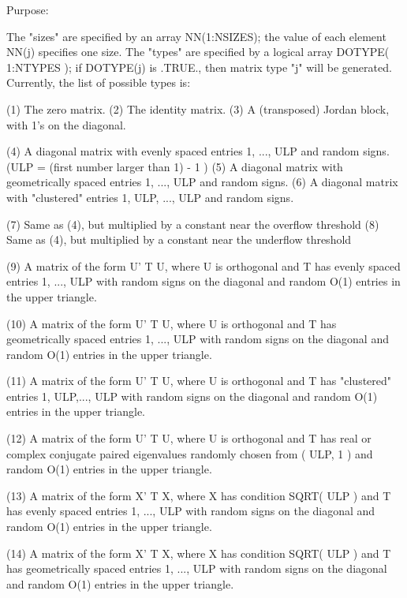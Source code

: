 \begin{DoxyParagraph}{Purpose\+: }
\begin{DoxyVerb}
    The "sizes" are specified by an array NN(1:NSIZES); the value of
    each element NN(j) specifies one size.
    The "types" are specified by a logical array DOTYPE( 1:NTYPES );
    if DOTYPE(j) is .TRUE., then matrix type "j" will be generated.
    Currently, the list of possible types is:

    (1)  The zero matrix.
    (2)  The identity matrix.
    (3)  A (transposed) Jordan block, with 1's on the diagonal.

    (4)  A diagonal matrix with evenly spaced entries
         1, ..., ULP  and random signs.
         (ULP = (first number larger than 1) - 1 )
    (5)  A diagonal matrix with geometrically spaced entries
         1, ..., ULP  and random signs.
    (6)  A diagonal matrix with "clustered" entries 1, ULP, ..., ULP
         and random signs.

    (7)  Same as (4), but multiplied by a constant near
         the overflow threshold
    (8)  Same as (4), but multiplied by a constant near
         the underflow threshold

    (9)  A matrix of the form  U' T U, where U is orthogonal and
         T has evenly spaced entries 1, ..., ULP with random signs
         on the diagonal and random O(1) entries in the upper
         triangle.

    (10) A matrix of the form  U' T U, where U is orthogonal and
         T has geometrically spaced entries 1, ..., ULP with random
         signs on the diagonal and random O(1) entries in the upper
         triangle.

    (11) A matrix of the form  U' T U, where U is orthogonal and
         T has "clustered" entries 1, ULP,..., ULP with random
         signs on the diagonal and random O(1) entries in the upper
         triangle.

    (12) A matrix of the form  U' T U, where U is orthogonal and
         T has real or complex conjugate paired eigenvalues randomly
         chosen from ( ULP, 1 ) and random O(1) entries in the upper
         triangle.

    (13) A matrix of the form  X' T X, where X has condition
         SQRT( ULP ) and T has evenly spaced entries 1, ..., ULP
         with random signs on the diagonal and random O(1) entries
         in the upper triangle.

    (14) A matrix of the form  X' T X, where X has condition
         SQRT( ULP ) and T has geometrically spaced entries
         1, ..., ULP with random signs on the diagonal and random
         O(1) entries in the upper triangle.


\end{DoxyVerb}
\end{DoxyParagraph}
